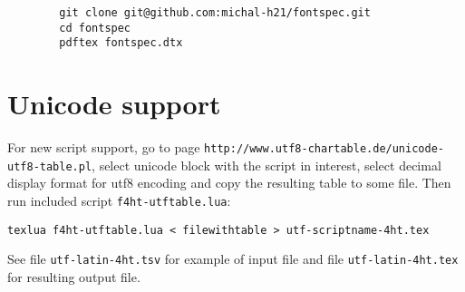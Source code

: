 \documentclass{article}
\begin{document}
	\begin{verbatim}
		git clone git@github.com:michal-h21/fontspec.git
		cd fontspec
		pdftex fontspec.dtx
	\end{verbatim} 
	
	\section{Unicode support}

	For new script support, go to page 
	\verb|http://www.utf8-chartable.de/unicode-utf8-table.pl|, 
	select unicode block with the script in interest, 
	select decimal display format for utf8 encoding and copy 
	the resulting table to some file. 
	Then run included script \verb|f4ht-utftable.lua|:

\begin{verbatim}
texlua f4ht-utftable.lua < filewithtable > utf-scriptname-4ht.tex
\end{verbatim} 

See file \verb|utf-latin-4ht.tsv| for example of input file and 
file \verb|utf-latin-4ht.tex| for resulting output file.
\end{document}
